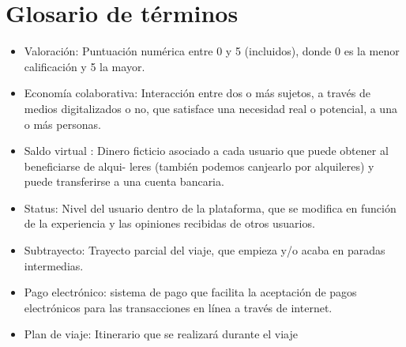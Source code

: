 \documentclass[11pt,spanish]{article} %
\begin{document}
\section{Glosario de términos}
\begin{itemize}
	\item Valoración: Puntuación numérica entre 0 y 5 (incluidos), donde 0 es la menor calificación y 5
la mayor.
	\item Economía colaborativa: Interacción entre dos o más sujetos, a través de medios digitalizados o
no, que satisface una necesidad real o potencial, a una o más personas.
	\item Saldo virtual : Dinero ficticio asociado a cada usuario que puede obtener al beneficiarse de alqui-
leres (también podemos canjearlo por alquileres) y puede transferirse a una cuenta bancaria.
	\item Status: Nivel del usuario dentro de la plataforma, que se modifica en función de la experiencia
y las opiniones recibidas de otros usuarios.
	\item Subtrayecto: Trayecto parcial del viaje, que empieza y/o acaba en paradas intermedias.
	\item Pago electrónico: sistema de pago que facilita la aceptación de pagos electrónicos para las transacciones en línea a través de internet.
	\item Plan de viaje: Itinerario que se realizará durante el viaje
\end{itemize}


\end{document}
